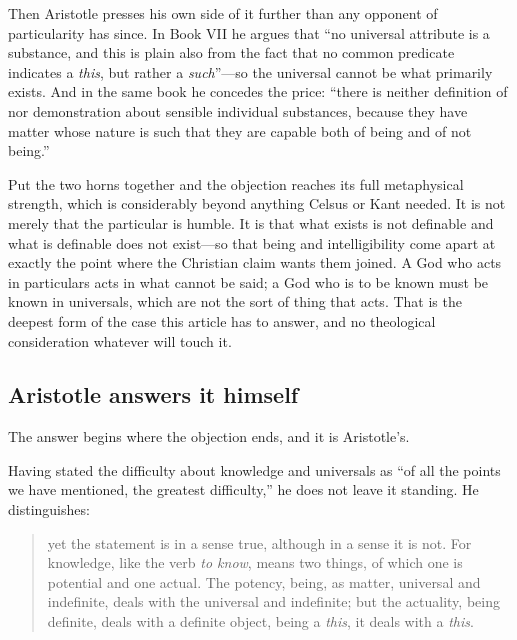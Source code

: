 Then Aristotle presses his own side of it further than any opponent of particularity has since. In Book VII he argues that ``no universal attribute is a substance, and this is plain also from the fact that no common predicate indicates a \emph{this}, but rather a \emph{such}''---so the universal cannot be what primarily exists. And in the same book he concedes the price: ``there is neither definition of nor demonstration about sensible individual substances, because they have matter whose nature is such that they are capable both of being and of not being.''

Put the two horns together and the objection reaches its full metaphysical strength, which is considerably beyond anything Celsus or Kant needed. It is not merely that the particular is humble. It is that what exists is not definable and what is definable does not exist---so that being and intelligibility come apart at exactly the point where the Christian claim wants them joined. A God who acts in particulars acts in what cannot be said; a God who is to be known must be known in universals, which are not the sort of thing that acts. That is the deepest form of the case this article has to answer, and no theological consideration whatever will touch it.

\subsection{Aristotle answers it himself}

The answer begins where the objection ends, and it is Aristotle's.

Having stated the difficulty about knowledge and universals as ``of all the points we have mentioned, the greatest difficulty,'' he does not leave it standing. He distinguishes:

\begin{quote}\small
yet the statement is in a sense true, although in a sense it is not. For knowledge, like the verb \emph{to know}, means two things, of which one is potential and one actual. The potency, being, as matter, universal and indefinite, deals with the universal and indefinite; but the actuality, being definite, deals with a definite object, being a \emph{this}, it deals with a \emph{this}.
\end{quote}


